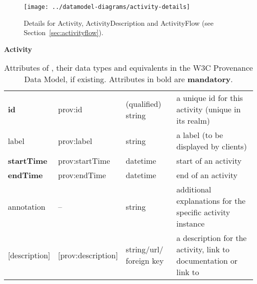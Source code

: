 \begin{figure}[h]
\centering
\texttt{[image: ../datamodel-diagrams/activity-details]}
\caption{Details for Activity, ActivityDescription and ActivityFlow (see Section~\ref{sec:activityflow}). 
}
\label{fig:activity-details}
\end{figure}



\begin{table}[h]

\small
{}\textwidth

\textbf{\normalsize Activity}\vspace{0.25em}\\
\begin{tabulary}{1.0\textwidth}{@{}lp{2.5cm}p{2cm}L@{}}
\toprule
{} &  &  & \\
\midrule
\textbf{id} & prov:id  & (qualified) string & a unique id for this activity (unique in its realm)\\
label        & prov:label  & string & a label (to be displayed by clients)\\
\textbf{startTime} & prov:startTime & datetime & start of an activity\\
\textbf{endTime} & prov:endTime  & datetime & end of an activity\\
annotation        & --  & string & additional explanations for the specific activity instance\\
{[description]}  & [prov:description] & string/url/ foreign key & a description for the activity, 
                link to documentation or link to \\
\bottomrule
\end{tabulary}
\caption{Attributes of , their data types and equivalents in the W3C Provenance 
Data Model, if existing. Attributes in bold are \textbf{mandatory}.}
\end{table}


